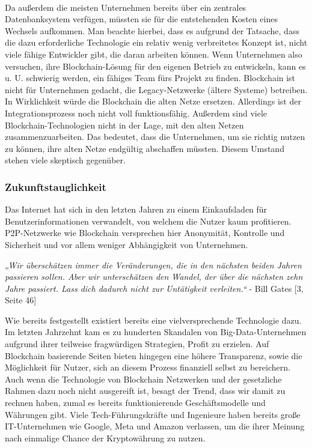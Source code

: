 \paragraph*{\mbox{}}
Da außerdem die meisten Unternehmen bereits über ein zentrales Datenbanksystem verfügen, müssten sie für die entstehenden Kosten eines Wechsels aufkommen.
Man beachte hierbei, dass es aufgrund der Tatsache, dass die dazu erforderliche Technologie ein relativ wenig verbreitetes Konzept ist, nicht viele fähige Entwickler gibt, die daran arbeiten können.
Wenn Unternehmen also versuchen, ihre Blockchain-Lösung für den eigenen Betrieb zu entwickeln, kann es u. U. schwierig werden, ein fähiges Team fürs Projekt zu finden.
Blockchain ist nicht für Unternehmen gedacht, die Legacy-Netzwerke (ältere Systeme) betreiben.
In Wirklichkeit würde die Blockchain die alten Netze ersetzen.
Allerdings ist der Integrationsprozess noch nicht voll funktionsfähig.
Außerdem sind viele Blockchain-Technologien nicht in der Lage, mit den alten Netzen zusammenzuarbeiten.
Das bedeutet, dass die Unternehmen, um sie richtig nutzen zu können, ihre alten Netze endgültig abschaffen müssten.
Diesem Umstand stehen viele skeptisch gegenüber.


\subsubsection{Zukunftstauglichkeit}
Das Internet hat sich in den letzten Jahren zu einem Einkaufsladen für Benutzerinformationen verwandelt, von welchem die Nutzer kaum profitieren.
P2P-Netzwerke wie Blockchain versprechen hier Anonymität, Kontrolle und Sicherheit und vor allem weniger Abhängigkeit von Unternehmen.

\textit{„Wir überschätzen immer die Veränderungen, die in den nächsten beiden Jahren passieren sollen. Aber wir unterschätzen den Wandel, der über die nächsten zehn Jahre passiert. Lass dich dadurch nicht zur Untätigkeit verleiten.“} - Bill Gates [3, Seite 46]

Wie bereits festgestellt existiert bereits eine vielversprechende Technologie dazu.
Im letzten Jahrzehnt kam es zu hunderten Skandalen von Big-Data-Unternehmen aufgrund ihrer teilweise fragwürdigen Strategien, Profit zu erzielen.
Auf Blockchain basierende Seiten bieten hingegen eine höhere Transparenz, sowie die Möglichkeit für Nutzer, sich an diesem Prozess finanziell selbst zu bereichern.
Auch wenn die Technologie von Blockchain Netzwerken und der gesetzliche Rahmen dazu noch nicht ausgereift ist, besagt der Trend, dass wir damit zu rechnen haben, zumal es bereits funktionierende Geschäftsmodelle und Währungen gibt.
Viele Tech-Führungskräfte und Ingenieure haben bereits große IT-Unternehmen wie Google, Meta und Amazon verlassen, um die ihrer Meinung nach einmalige Chance der Kryptowährung zu nutzen.\cite{NewYorkTimes StartUp}
